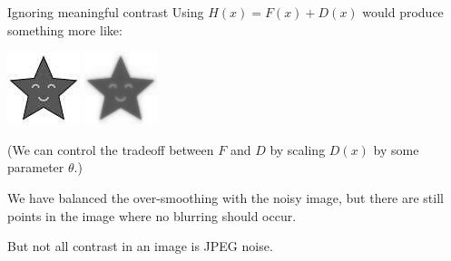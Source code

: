 \documentclass[10pt]{beamer}
\begin{document}
\begin{frame}{Ignoring meaningful contrast}
Using $H(x) = F(x) + D(x)$ would produce something more like:

\begin{center}
\includegraphics[scale=0.8]{results/bw-star-tmp} 
\hspace{4em}
\includegraphics[scale=0.8]{img/bw-fail-robust}
\end{center}
(We can control the tradeoff between $F$ and $D$ by scaling $D(x)$ by some parameter $\theta$.)

We have balanced the over-smoothing with the noisy image, but there are still points in the image where no blurring should occur.

But not all contrast in an image is JPEG noise.








\end{frame}
\end{document}
